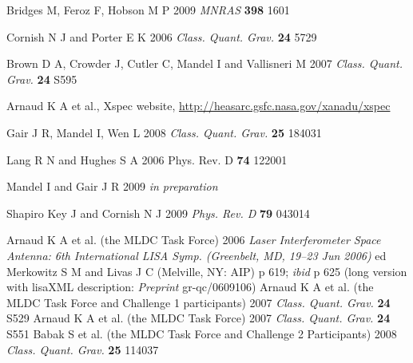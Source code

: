 \documentclass{iopart}
\begin{document}
\begin{thebibliography}{99}
Bridges M, Feroz F, Hobson M P 2009 \textit{MNRAS} \textbf{398} 1601

 Cornish N J and Porter E K 2006
\textit{Class. Quant. Grav.} \textbf{24} 5729

Brown D A, Crowder J, Cutler C, Mandel I and Vallisneri M 2007
\textit{Class. Quant. Grav.} \textbf{24} S595  

 Arnaud K A et al., Xspec website, \url{http://heasarc.gsfc.nasa.gov/xanadu/xspec}

Gair J R, Mandel I, Wen L 2008 {\em Class. Quant. Grav.} \textbf{25} 184031

 Lang R N and Hughes S A 2006 Phys. Rev. D \textbf{74} 122001

Mandel I and Gair J R 2009 \textit{in preparation}

 Shapiro Key J and Cornish N J 2009 \textit{Phys. Rev. D} \textbf{79} 043014

 Arnaud K A et al. (the MLDC Task Force) 2006 \textit{Laser Interferometer Space Antenna: 6th International LISA Symp. (Greenbelt, MD, 19--23 Jun 2006)} ed Merkowitz S M and Livas J C (Melville, NY: AIP) p 619; \textit{ibid} p 625 (long version with lisaXML description: \textit{Preprint} gr-qc/0609106)
%
 Arnaud K A et al. (the MLDC Task Force and Challenge 1 participants) 2007 \textit{Class. Quant. Grav.} \textbf{24} S529
%
 Arnaud K A et al. (the MLDC Task Force) 2007 \textit{Class. Quant. Grav.} \textbf{24} S551
%
 Babak S et al. (the MLDC Task Force and Challenge 2 Participants) 2008 \textit{Class. Quant. Grav.} \textbf{25} 114037

\end{thebibliography}
\end{document}

